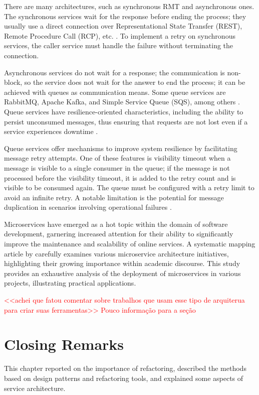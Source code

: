 There are many architectures, such as synchronous RMT and asynchronous ones. The synchronous services wait for the response before ending the process; they usually use a direct connection over Representational State Transfer (REST), Remote Procedure Call (RCP), etc. \cite{microservices-comuni}. To implement a retry on synchronous services, the caller service must handle the failure without terminating the connection.

Asynchronous services do not wait for a response; the communication is non-block, so the service does not wait for the answer to end the process; it can be achieved with queues as communication means. Some queue services are RabbitMQ, Apache Kafka, and Simple Service Queue (SQS), among others \cite{KARABEYAKSAKALLI2021111014}. Queue services have resilience-oriented characteristics, including the ability to persist unconsumed messages, thus ensuring that requests are not lost even if a service experiences downtime \cite{Cebeci2020DesignOA}.

Queue services offer mechanisms to improve system resilience by facilitating message retry attempts. One of these features is visibility timeout when a message is visible to a single consumer in the queue; if the message is not processed before the visibility timeout, it is added to the retry count and is visible to be consumed again. The queue must be configured with a retry limit to avoid an infinite retry. A notable limitation is the potential for message duplication in scenarios involving operational failures \cite{ChenScalable}.

Microservices have emerged as a hot topic within the domain of software development, garnering increased attention for their ability to significantly improve the maintenance and scalability of online services. A systematic mapping article by \textcite{Alshuqayran} carefully examines various microservice architecture initiatives, highlighting their growing importance within academic discourse. This study provides an exhaustive analysis of the deployment of microservices in various projects, illustrating practical applications.

\textcolor{red}{<<achei que fatou comentar sobre trabalhos que usam esse tipo de arquiterua para criar suas ferramentas>> Pouco informação para a seção}

\section{Closing Remarks}
\label{sec2-remarks}
This chapter reported on the importance of refactoring, described the methods based on design patterns and refactoring tools, and explained some aspects of service architecture.


